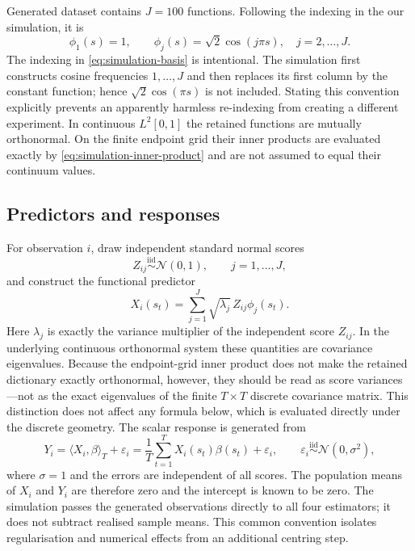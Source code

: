 Generated dataset contains $J=100$ functions.  Following the indexing in
the our simulation, it is
\begin{equation}
    \phi_1(s)=1,
    \qquad
    \phi_j(s)=\sqrt{2}\cos(j\pi s),
    \quad j=2,\ldots,J.
    \label{eq:simulation-basis}
\end{equation}
The indexing in \eqref{eq:simulation-basis} is intentional.  The simulation first
constructs cosine frequencies $1,\ldots,J$ and then replaces its first column
by the constant function; hence $\sqrt{2}\cos(\pi s)$ is not included.  Stating
this convention explicitly prevents an apparently harmless re-indexing from
creating a different experiment.  In continuous $L^2[0,1]$ the retained
functions are mutually orthonormal.  On the finite endpoint grid their
inner products are evaluated exactly by \eqref{eq:simulation-inner-product}
and are not assumed to equal their continuum values.

\subsection{Predictors and responses}

For observation $i$, draw independent standard normal scores
\begin{equation}
    Z_{ij}\stackrel{\mathrm{iid}}{\sim}\mathcal N(0,1),
    \qquad j=1,\ldots,J,
\end{equation}
and construct the functional predictor
\begin{equation}
    X_i(s_t)
    =\sum_{j=1}^{J}\sqrt{\lambda_j}\,Z_{ij}\phi_j(s_t).
    \label{eq:simulation-predictor}
\end{equation}
Here $\lambda_j$ is exactly the variance multiplier of the independent score
$Z_{ij}$.  In the underlying continuous orthonormal system these quantities
are covariance eigenvalues.  Because the endpoint-grid inner product does not
make the retained dictionary exactly orthonormal, however, they should be read
as score variances---not as the exact eigenvalues of the finite $T\times T$
discrete covariance matrix.  This distinction does not affect any formula
below, which is evaluated directly under the discrete geometry.
The scalar response is generated from
\begin{equation}
    Y_i
    =\langle X_i,\beta\rangle_T+\varepsilon_i
    =\frac1T\sum_{t=1}^{T}X_i(s_t)\beta(s_t)+\varepsilon_i,
    \qquad
    \varepsilon_i\stackrel{\mathrm{iid}}{\sim}\mathcal N(0,\sigma^2),
    \label{eq:simulation-response}
\end{equation}
where $\sigma=1$ and the errors are independent of all scores.  The population
means of $X_i$ and $Y_i$ are therefore zero and the intercept is known to be
zero.  The simulation passes the generated observations directly to all four
estimators; it does not subtract realised sample means.  This common convention
isolates regularisation and numerical effects from an additional centring
step.

